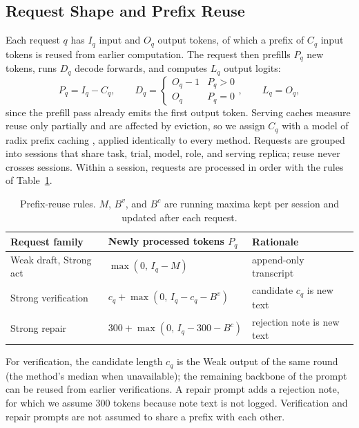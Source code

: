 \documentclass[11pt, copyright, logo, secondlogo]{template/lark}
\begin{document}
\subsection{Request Shape and Prefix Reuse}
\label{sec:analysis_ledger}

Each request $q$ has $I_q$ input and $O_q$ output tokens, of which a prefix of
$C_q$ input tokens is reused from earlier computation. The request then
prefills $P_q$ new tokens, runs $D_q$ decode forwards, and computes $L_q$
output logits:
\begin{equation}
P_q=I_q-C_q,\qquad
D_q=\begin{cases}O_q-1 & P_q>0\\ O_q & P_q=0\end{cases},\qquad
L_q=O_q,
\label{eq:request_shape}
\end{equation}
since the prefill pass already emits the first output token. Serving caches
measure reuse only partially and are affected by eviction, so we assign $C_q$
with a model of radix prefix caching \citep{zheng2024sglang}, applied
identically to every method. Requests are grouped into sessions that share
task, trial, model, role, and serving replica; reuse never crosses sessions.
Within a session, requests are processed in order with the rules of
Table~\ref{tab:radix_rules}.

\begin{table}[h]
\caption{Prefix-reuse rules. $M$, $B^{v}$, and $B^{c}$ are running maxima
kept per session and updated after each request.}
\label{tab:radix_rules}
\centering
\small
\begin{tabular}{@{}lll@{}}
\toprule
Request family & Newly processed tokens $P_q$ & Rationale \\
\midrule
Weak draft, Strong act & $\max(0,\,I_q-M)$ & append-only transcript \\
Strong verification & $c_q+\max(0,\,I_q-c_q-B^{v})$ & candidate $c_q$ is new text \\
Strong repair & $300+\max(0,\,I_q-300-B^{c})$ & rejection note is new text \\
\bottomrule
\end{tabular}
\end{table}

For verification, the candidate length $c_q$ is the Weak output of the same
round (the method's median when unavailable); the remaining backbone of the
prompt can be reused from earlier verifications. A repair prompt adds a
rejection note, for which we assume 300 tokens because note text is not
logged. Verification and repair prompts are not assumed to share a prefix
with each other.
\end{document}
